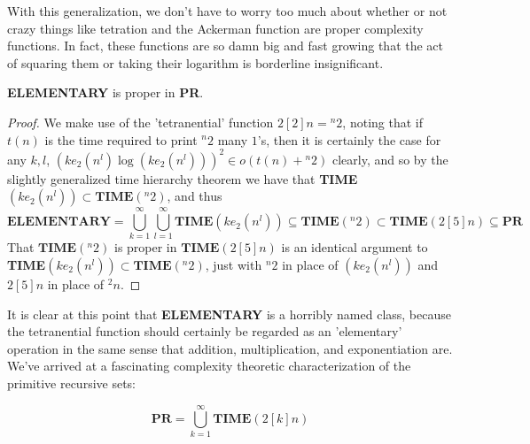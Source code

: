 With this generalization, we don't have to worry too much about whether or not crazy things like tetration and the Ackerman function are proper complexity functions. In fact, these functions are so damn big and fast growing that the act of squaring them or taking their logarithm is borderline insignificant.  
\begin{corollary}
	\textbf{ELEMENTARY} is proper in \textbf{PR}.
\end{corollary}
\begin{proof}
	We make use of the 'tetranential' function $2[2]n = {}^n2$, noting that if $t(n)$ is the time required to print ${}^n2$ many $1$'s, then it is certainly the case for any $k,l$, $(ke_2(n^l)\log(ke_2(n^l)))^2 \in o(t(n)+{}^n2)$ clearly, and so by the slightly generalized time hierarchy theorem we have that \textbf{TIME}$(ke_2(n^l)) \subset \textbf{TIME}({}^n 2)$, and thus
	\[\textbf{ELEMENTARY} = \bigcup_{k=1}^{\infty}\bigcup_{l=1}^{\infty}\textbf{TIME}(ke_2(n^l)) \subseteq \textbf{TIME}({}^n 2) \subset \textbf{TIME}(2[5]n) \subseteq \textbf{PR}  \]
That $\textbf{TIME}({}^n2)$ is proper in $\textbf{TIME}(2[5]n)$ is an identical argument to \textbf{TIME}$(ke_2(n^l)) \subset \textbf{TIME}({}^n 2)$, just with ${}^n2$ in place of $(ke_2(n^l))$ and $2[5]n$ in place of ${}^2n$.
\end{proof}
It is clear at this point that \textbf{ELEMENTARY} is a horribly named class, because the tetranential function should certainly be regarded as an 'elementary' operation in the same sense that addition, multiplication, and exponentiation are. We've arrived at a fascinating complexity theoretic characterization of the primitive recursive sets:
\begin{theorem}
	\[ \textbf{PR} = \bigcup_{k=1}^{\infty}\textbf{TIME}(2[k]n) \]
\end{theorem}
